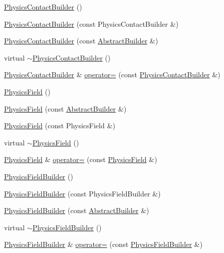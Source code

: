 \begin{DoxyCompactItemize}
\item 
\hyperlink{namespacejli_aea643af7d1f6e26fbfe89083f21af41e}{Physics\+Contact\+Builder} ()
\item 
\hyperlink{namespacejli_a1ba1e346098dfdff4672e3751cc5af01}{Physics\+Contact\+Builder} (const Physics\+Contact\+Builder \&)
\item 
\hyperlink{namespacejli_aa47f3bd4a0fff03f0bfed6cb895496a5}{Physics\+Contact\+Builder} (const \hyperlink{classjli_1_1_abstract_builder}{Abstract\+Builder} \&)
\item 
virtual \hyperlink{namespacejli_aa54009c7e43166072a32826d3baa4975}{$\sim$\+Physics\+Contact\+Builder} ()
\item 
\hyperlink{namespacejli_aea643af7d1f6e26fbfe89083f21af41e}{Physics\+Contact\+Builder} \& \hyperlink{namespacejli_af5f2d415ac3003221faf09452f3e0e52}{operator=} (const \hyperlink{namespacejli_aea643af7d1f6e26fbfe89083f21af41e}{Physics\+Contact\+Builder} \&)
\item 
\hyperlink{namespacejli_a0a08739050a9f0d65a42f52165e144da}{Physics\+Field} ()
\item 
\hyperlink{namespacejli_a7de2a9a810c6e0c8ae0cf9f9b5e45dd2}{Physics\+Field} (const \hyperlink{classjli_1_1_abstract_builder}{Abstract\+Builder} \&)
\item 
\hyperlink{namespacejli_a81ad65e3c5a7904b33ac3905d1ad36a1}{Physics\+Field} (const Physics\+Field \&)
\item 
virtual \hyperlink{namespacejli_aec2c4f308d34637940e5e64cdc8c0f86}{$\sim$\+Physics\+Field} ()
\item 
\hyperlink{namespacejli_a0a08739050a9f0d65a42f52165e144da}{Physics\+Field} \& \hyperlink{namespacejli_a128ad3fb294f27690b42d3bdb3d467cd}{operator=} (const \hyperlink{namespacejli_a0a08739050a9f0d65a42f52165e144da}{Physics\+Field} \&)
\item 
\hyperlink{namespacejli_a3993b3872eea01dec1c9bd07bb35aae8}{Physics\+Field\+Builder} ()
\item 
\hyperlink{namespacejli_a39d15433c9d678a3a3c08b94e29460f0}{Physics\+Field\+Builder} (const Physics\+Field\+Builder \&)
\item 
\hyperlink{namespacejli_acc1e7447340e93ed56fa2d461b7364fb}{Physics\+Field\+Builder} (const \hyperlink{classjli_1_1_abstract_builder}{Abstract\+Builder} \&)
\item 
virtual \hyperlink{namespacejli_a1e88f936038ad9dcf194653553aaa9d6}{$\sim$\+Physics\+Field\+Builder} ()
\item 
\hyperlink{namespacejli_a3993b3872eea01dec1c9bd07bb35aae8}{Physics\+Field\+Builder} \& \hyperlink{namespacejli_a8eb5ca2da7648ae789063468ec4d5b1c}{operator=} (const \hyperlink{namespacejli_a3993b3872eea01dec1c9bd07bb35aae8}{Physics\+Field\+Builder} \&)

\end{DoxyCompactItemize}
